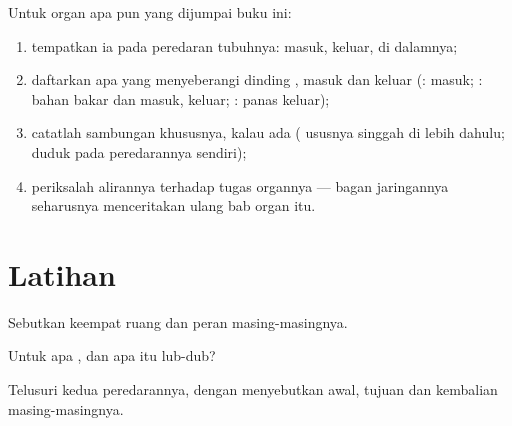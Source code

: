 \begin{method}\label{met:g7:heart-and-circulation:map}
Untuk organ apa pun yang dijumpai buku ini:
\begin{enumerate}
  \item tempatkan ia pada peredaran tubuhnya:  masuk, 
        keluar,  di dalamnya;
  \item daftarkan apa yang menyeberangi dinding , masuk dan
        keluar (:  masuk; : bahan bakar dan
         masuk,  keluar; : panas keluar);
  \item catatlah sambungan khususnya, kalau ada ( ususnya singgah
        di  lebih dahulu;  duduk pada peredarannya
        sendiri);
  \item periksalah alirannya terhadap tugas organnya --- bagan
        jaringannya seharusnya menceritakan ulang bab organ itu.
\end{enumerate}
\end{method}

\section{Latihan}

\begin{exercise}[$\star$]\label{exo:g7:heart-and-circulation:1}
Sebutkan keempat ruang  dan peran masing-masingnya.
\end{exercise}

\begin{exercise}[$\star$]\label{exo:g7:heart-and-circulation:2}
Untuk apa , dan apa itu lub-dub?
\end{exercise}

\begin{exercise}[$\star$]\label{exo:g7:heart-and-circulation:3}
Telusuri kedua peredarannya, dengan menyebutkan awal, tujuan dan
kembalian masing-masingnya.
\end{exercise}

